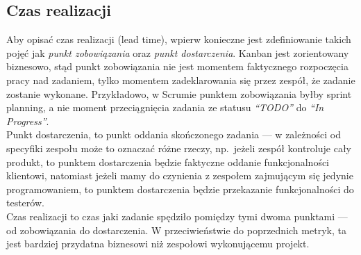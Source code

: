 \subsection*{Czas realizacji}
Aby opisać czas realizacji (lead time), wpierw konieczne jest zdefiniowanie takich pojęć jak \textit{punkt zobowiązania} oraz \textit{punkt dostarczenia}.
Kanban jest zorientowany biznesowo, stąd punkt zobowiązania nie jest momentem faktycznego rozpoczęcia pracy nad zadaniem, tylko momentem zadeklarowania się przez zespół, że zadanie zostanie wykonane.
Przykładowo, w Scrumie punktem zobowiązania byłby sprint planning, a nie moment przeciągnięcia zadania ze statusu \textit{``TODO''} do \textit{``In Progress''}.\\
Punkt dostarczenia, to punkt oddania skończonego zadania --- w zależności od specyfiki zespołu może to oznaczać różne rzeczy, np.\ jeżeli zespół kontroluje cały produkt, to punktem dostarczenia
będzie faktyczne oddanie funkcjonalności klientowi, natomiast jeżeli mamy do czynienia z zespołem zajmującym się jedynie programowaniem, to punktem dostarczenia będzie przekazanie funkcjonalności do testerów.\\
Czas realizacji to czas jaki zadanie spędziło pomiędzy tymi dwoma punktami --- od zobowiązania do dostarczenia.
W przeciwieństwie do poprzednich metryk, ta jest bardziej przydatna biznesowi niż zespołowi wykonującemu projekt.
